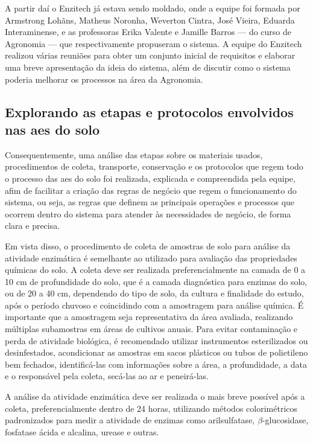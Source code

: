 A partir daí o Enzitech já estava sendo moldado, onde a equipe foi formada por Armstrong Lohãns, Matheus Noronha, Weverton Cintra, José Vieira, Eduarda Interaminense, e as professoras Erika Valente e Jamille Barros — do curso de Agronomia — que respectivamente propuseram o sistema. A equipe do Enzitech realizou várias reuniões para obter um conjunto inicial de requisitos e elaborar uma breve apresentação da ideia do sistema, além de discutir como o sistema poderia melhorar os processos na área da Agronomia.

\subsection{Explorando as etapas e protocolos envolvidos nas \acp{ae} do solo}
Consequentemente, uma análise das etapas sobre os materiais usados, procedimentos de coleta, transporte, conservação e os protocolos que regem todo o processo das \acp{ae} do solo foi realizada, explicada e compreendida pela equipe, afim de facilitar a criação das regras de negócio que regem o funcionamento do sistema, ou seja, as regras que definem as principais operações e processos que ocorrem dentro do sistema para atender às necessidades de negócio, de forma clara e precisa.

Em vista disso, o procedimento de coleta de amostras de solo para análise da atividade enzimática é semelhante ao utilizado para avaliação das propriedades químicas do solo. A coleta deve ser realizada preferencialmente na camada de 0 a 10 cm de profundidade do solo, que é a camada diagnóstica para enzimas do solo, ou de 20 a 40 cm, dependendo do tipo de solo, da cultura e finalidade do estudo, após o período chuvoso e coincidindo com a amostragem para análise química. É importante que a amostragem seja representativa da área avaliada, realizando múltiplas subamostras em áreas de cultivos anuais. Para evitar contaminação e perda de atividade biológica, é recomendado utilizar instrumentos esterilizados ou desinfestados, acondicionar as amostras em sacos plásticos ou tubos de polietileno bem fechados, identificá-las com informações sobre a área, a profundidade, a data e o responsável pela coleta, secá-las ao ar e peneirá-las. 

A análise da atividade enzimática deve ser realizada o mais breve possível após a coleta, preferencialmente dentro de 24 horas, utilizando métodos colorimétricos padronizados para medir a atividade de enzimas como arilsulfatase, $\beta$-glucosidase, fosfatase ácida e alcalina, urease e outras.

